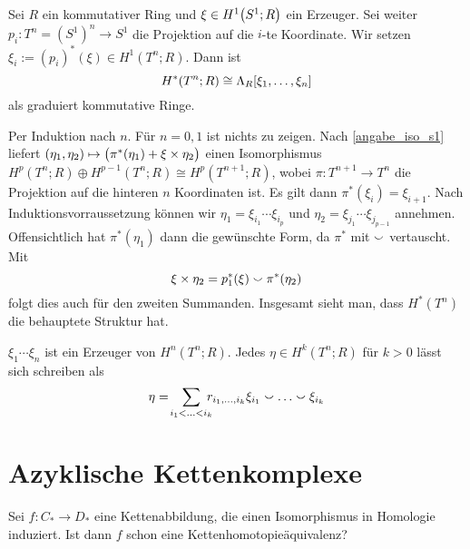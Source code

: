 \begin{satz}[{name=[Kohomologie des Torus]}]
	Sei $R$ ein kommutativer Ring und $\xi \in H^1 \enbrace*{S^1;R}$ ein Erzeuger. 
	Sei weiter $p_i \colon T^n = (S^1)^n \to S^1$ die Projektion auf die $i$-te Koordinate. 
	Wir setzen $\xi_i := (p_i)^*(\xi) \in H^1(T^n;R)$. Dann ist 
	\[
		H^*(T^n;R) \cong \Lambda_R \benbrace*{\xi_1, \ldots ,\xi_n}
	\]
	als graduiert kommutative Ringe.
\end{satz}
\begin{beweis}
	Per Induktion nach $n$. Für $n=0,1$ ist nichts zu zeigen. 
	Nach \autoref{angabe_iso_s1} liefert $(\eta_1,\eta_2) \mapsto \enbrace[\big]{\pi^*(\eta_1) + \xi\times \eta_2}$ einen Isomorphismus $H^p(T^n;R) \oplus H^{p-1}(T^n;R) \cong H^{p}(T^{n+1};R)$, wobei $\pi \colon T^{n+1} \to T^n$ die Projektion auf die hinteren $n$ Koordinaten ist.
	Es gilt dann $\pi^*(\xi_i) = \xi_{i+1}$.
	Nach Induktionsvorraussetzung können wir $\eta_1 = \xi_{i_1} \cdots \xi_{i_p}$ und $\eta_2 = \xi_{j_1} \cdots \xi_{j_{p-1}}$ annehmen.
	Offensichtlich hat $\pi^*(\eta_1)$ dann die gewünschte Form, da $\pi^*$ mit $\cupp$ vertauscht. Mit 
	\[
		\xi \times \eta_2 = p_1^*(\xi) \cupp \pi^*(\eta_2)
	\]
	folgt dies auch für den zweiten Summanden.
	Insgesamt sieht man, dass $H^*(T^n)$ die behauptete Struktur hat.
\end{beweis}

\begin{beispiel}[{name=[Kohomologieklassen des Torus]}]
	$\xi_1 \cdots \xi_n$ ist ein Erzeuger von $H^n(T^n;R)$. Jedes $\eta \in H^k(T^n;R)$ für $k>0$ lässt sich schreiben als
	\[
		\eta= \!\smashoperator[r]{\sum_{i_1<\ldots <i_k}}\,\, r_{i_1,\ldots ,i_k} \xi_{i_1} \cupp \ldots \cupp \xi_{i_k}
	\]
\end{beispiel}
\newpage

\section{Azyklische Kettenkomplexe} %
\label{sec:5}

\begin{frage}
	Sei $f  \colon C_* \to D_*$ eine Kettenabbildung, die einen Isomorphismus in Homologie induziert. Ist dann $f$ schon eine Kettenhomotopieäquivalenz?
\end{frage}

